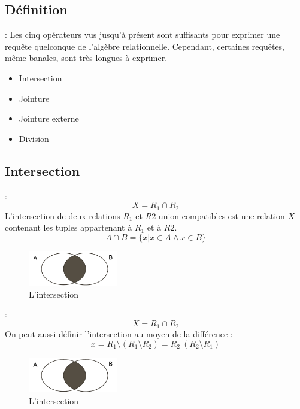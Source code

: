 \documentclass[10pt]{beamer}
\begin{document}
\subsection{Définition}
\begin{frame}{\secname : \subsecname}
    Les cinq opérateurs vus jusqu'à présent sont suffisants pour exprimer une requête quelconque de l’algèbre relationnelle.  Cependant, certaines requêtes, même banales, sont très longues à exprimer.
    \begin{itemize}
        \item Intersection
        \item Jointure
        \item Jointure externe
        \item Division
    \end{itemize}
\end{frame}

\subsection{Intersection}
\begin{frame}{\secname : \subsecname}
    $$
        X = R_1 \cap R_2
    $$
    L’intersection de deux relations $R_1$ et $R2$ union-compatibles est une relation $X$ contenant les tuples appartenant à $R_1$ et à $R2$.
    $$
        A \cap B = \{ x | x \in A \land x \in B \}
    $$
    \begin{figure}
        \begin{center}
            \includegraphics[width=0.35\textwidth]{../assets/img/intersection.pdf}
            \caption{L’intersection}
            \label{Fig:intersection}
        \end{center}
    \end{figure}
\end{frame}

\begin{frame}{\secname : \subsecname}
    $$
        X = R_1 \cap R_2
    $$
    On peut aussi définir l’intersection au moyen de la différence :
    $$
        x = R_1 \setminus (R_1 \setminus R_2) = R_2 \ (R_2 \setminus R_1)
    $$
    \begin{figure}
        \begin{center}
            \includegraphics[width=0.35\textwidth]{../assets/img/intersection.pdf}
            \caption{L’intersection}
        \end{center}
    \end{figure}
\end{frame}
\end{document}
